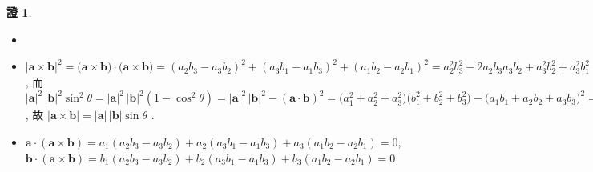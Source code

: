 \documentclass[12pt]{extarticle}
\newcommand{\ds}{\displaystyle}
\theoremstyle{definition}
\newtheorem*{prf}{證}
\newcommand{\va}{\mathbf{a}}
\newcommand{\vb}{\mathbf{b}}
\begin{document}
\begin{prf}
  \begin{itemize}\setlength{\itemsep}{0pt}
    \item[]
    \item $\ds|\va\times\vb|^2 =\big(\va\times\vb\big)\cdot\big(\va\times\vb\big) = (a_2b_3-a_3b_2)^2 + (a_3b_1-a_1b_3)^2 + (a_1b_2-a_2b_1)^2 = a_2^2b_3^2-2a_2b_3a_3b_2+a_3^2b_2^2 +a_3^2b_1^2-2a_3b_1a_1b_3+a_1^2b_3^2 + a_1^2b_2^2-2a_1b_2a_2b_1+a_2^2b_1^2$, 而 $\ds|\va|^2\,|\vb|^2\sin^2\theta = |\va|^2\,|\vb|^2(1 - \cos^2\theta) = |\va|^2\,|\vb|^2 - (\va\cdot\vb)^2 = \big(a_1^2+a_2^2+a_3^2\big)\big(b_1^2+b_2^2+b_3^2\big)-\big(a_1b_1+a_2b_2+a_3b_3\big)^2 = a_1^2b_2^2+a_1^2b_3^2+a_2^2b_1^2+a_2^2b_3^2+a_3^2b_1^2+a_3^2b_2^2 - \big(2a_1b_1a_2b_2+2a_1b_1a_3b_3+2a_2b_2a_3b_3\big)$, 故 $|\va\times\vb|=|\va|\,|\vb|\sin\theta$ . 
    \item $\ds\va\cdot(\va\times\vb) = a_1(a_2 b_3 - a_3 b_2) + a_2(a_3 b_1 - a_1 b_3) + a_3(a_1 b_2 - a_2 b_1) = 0$, \\$\ds\vb\cdot(\va\times\vb) = b_1(a_2 b_3 - a_3 b_2) + b_2(a_3 b_1 - a_1 b_3) + b_3(a_1 b_2 - a_2 b_1) = 0$

\end{itemize}
\end{prf}
\end{document}
